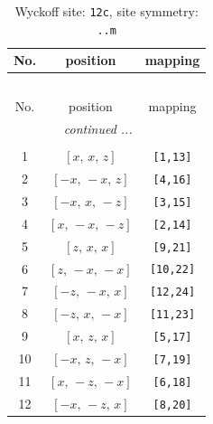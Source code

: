 \documentclass[fleqn,8pt]{jsarticle}
\begin{document}
\begin{longtable}{ccc}
\caption{Wyckoff site: {\tt 12c}, site symmetry: {\tt ..m}}
 \\
 \hline \hline
No. & position & mapping \\ \hline \endfirsthead

\multicolumn{2}{l}{\tablename\ \thetable{}} \\
 \hline \hline
No. & position & mapping \\ \hline \endhead

 \hline \hline
\multicolumn{2}{r}{\footnotesize\it continued ...} \\ \endfoot

 \hline \hline
\multicolumn{2}{r}{} \\ \endlastfoot

1 & $\left[ x,\, x,\, z \right]$ & {\tt [1,13]} \\ \hline
2 & $\left[ - x,\, - x,\, z \right]$ & {\tt [4,16]} \\ \hline
3 & $\left[ - x,\, x,\, - z \right]$ & {\tt [3,15]} \\ \hline
4 & $\left[ x,\, - x,\, - z \right]$ & {\tt [2,14]} \\ \hline
5 & $\left[ z,\, x,\, x \right]$ & {\tt [9,21]} \\ \hline
6 & $\left[ z,\, - x,\, - x \right]$ & {\tt [10,22]} \\ \hline
7 & $\left[ - z,\, - x,\, x \right]$ & {\tt [12,24]} \\ \hline
8 & $\left[ - z,\, x,\, - x \right]$ & {\tt [11,23]} \\ \hline
9 & $\left[ x,\, z,\, x \right]$ & {\tt [5,17]} \\ \hline
10 & $\left[ - x,\, z,\, - x \right]$ & {\tt [7,19]} \\ \hline
11 & $\left[ x,\, - z,\, - x \right]$ & {\tt [6,18]} \\ \hline
12 & $\left[ - x,\, - z,\, x \right]$ & {\tt [8,20]} \\
\end{longtable}
\renewcommand{\arraystretch}{1.2}
\end{document}
